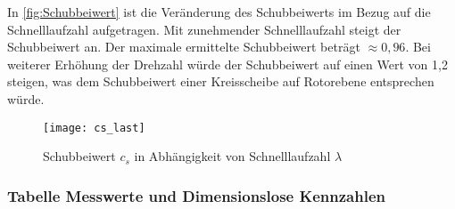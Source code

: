 In \autoref{fig:Schubbeiwert} ist die Veränderung des Schubbeiwerts im Bezug auf die Schnelllaufzahl aufgetragen.
Mit zunehmender Schnelllaufzahl steigt der Schubbeiwert an. Der maximale ermittelte Schubbeiwert beträgt $\approx 0,96$. Bei weiterer Erhöhung der Drehzahl würde der Schubbeiwert auf einen Wert von 1,2 steigen, was dem Schubbeiwert einer Kreisscheibe auf Rotorebene entsprechen würde.
\begin{figure}[H]
    \centering
    \texttt{[image: cs\_last]}
    \caption{Schubbeiwert $c_s$ in Abhängigkeit von Schnelllaufzahl $\lambda$}
    \label{fig:Schubbeiwert}
\end{figure}

\subsubsection*{Tabelle Messwerte und Dimensionslose Kennzahlen}
